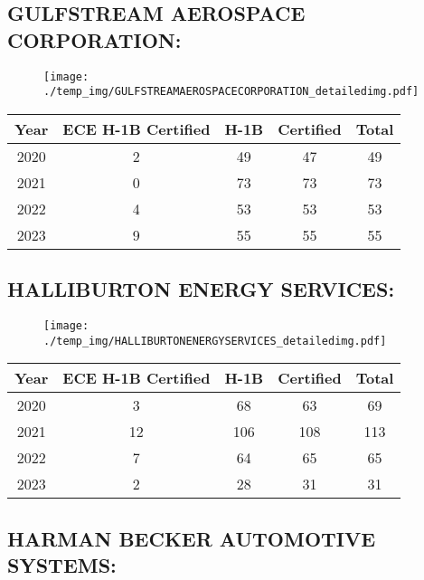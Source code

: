 \documentclass{article}%
\begin{document}
%
\newpage%
\subsection{GULFSTREAM AEROSPACE CORPORATION:}%
\label{subsec:GULFSTREAMAEROSPACECORPORATION}%
\label{GULFSTREAMAEROSPACECORPORATIONdetailed}%


\begin{figure}[htbp]%
\centering%
\texttt{[image: ./temp\_img/GULFSTREAMAEROSPACECORPORATION\_detailedimg.pdf]}%
\end{figure}

%
\begin{longtable}{c|c|c|c|c}%
\hline%
Year&ECE H{-}1B Certified&H{-}1B&Certified&Total\\%
\hline%
2020&2&49&47&49\\%
\hline%
2021&0&73&73&73\\%
\hline%
2022&4&53&53&53\\%
\hline%
2023&9&55&55&55\\%
\hline%
\end{longtable}

%
\newpage%
\subsection{HALLIBURTON ENERGY SERVICES:}%
\label{subsec:HALLIBURTONENERGYSERVICES}%
\label{HALLIBURTONENERGYSERVICESdetailed}%


\begin{figure}[htbp]%
\centering%
\texttt{[image: ./temp\_img/HALLIBURTONENERGYSERVICES\_detailedimg.pdf]}%
\end{figure}

%
\begin{longtable}{c|c|c|c|c}%
\hline%
Year&ECE H{-}1B Certified&H{-}1B&Certified&Total\\%
\hline%
2020&3&68&63&69\\%
\hline%
2021&12&106&108&113\\%
\hline%
2022&7&64&65&65\\%
\hline%
2023&2&28&31&31\\%
\hline%
\end{longtable}

%
\newpage%
\subsection{HARMAN BECKER AUTOMOTIVE SYSTEMS:}%
\label{subsec:HARMANBECKERAUTOMOTIVESYSTEMS}%
\label{HARMANBECKERAUTOMOTIVESYSTEMSdetailed}%
\end{document}
